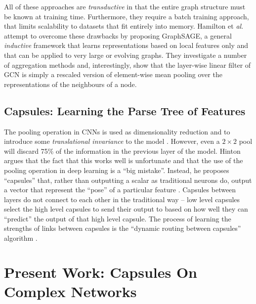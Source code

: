 \documentclass{IEEEtran}
\begin{document}
	All of these approaches are \textit{transductive} in that the entire graph structure must be known at training time. Furthermore, they require a batch training approach, that limits scalability to datasets that fit entirely into memory. 
	Hamilton et \textit{al}. \cite{hamilton2017inductive} attempt to overcome these drawbacks by proposing GraphSAGE, a general \textit{inductive} framework that learns representations based on local features only and that can be applied to very large or evolving graphs. 
	They investigate a number of aggregation methods and, interestingly, show that the layer-wise linear filter of GCN is simply a rescaled version of element-wise mean pooling over the representations of the neighbours of a node.
	
	
		
	
	\subsection{Capsules: Learning the Parse Tree of Features}
	The pooling operation in CNNs is used as dimensionality reduction and to introduce some \textit{translational invariance} to the model \cite{krizhevsky2012imagenet}. 
	However, even a $2\times2$ pool will discard 75\% of the information in the previous layer of the model.
	Hinton argues that the fact that this works well is unfortunate and that the use of the pooling operation in deep learning is a ``big mistake''.
	Instead, he proposes ``capsules'' that, rather than outputting a scalar as traditional neurons do, output a vector that represent the ``pose'' of a particular feature \cite{hinton2011transforming}.
	Capsules between layers do not connect to each other in the traditional way -- low level capsules select the high level capsules to send their output to based on how well they can ``predict'' the output of that high level capsule.
	The process of learning the strengths of links between capsules is the ``dynamic routing between capsules'' algorithm \cite{sabour2017dynamic}. 
	
	
	
	\section{Present Work: Capsules On Complex Networks}
	
	
	
	
	
	
\end{document}
